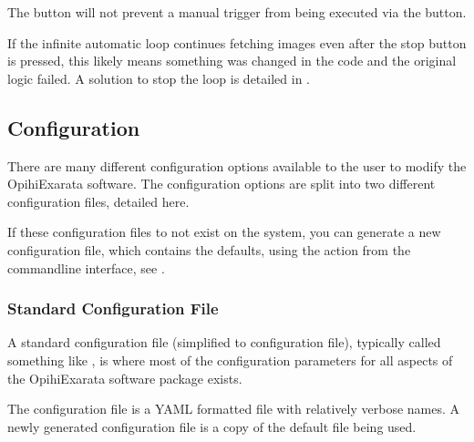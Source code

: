 \documentclass[letterpaper,11pt,english]{sphinxmanual}
\begin{document}
\sphinxAtStartPar
The  button will not prevent a manual trigger from being
executed via the  button.

\sphinxAtStartPar
If the infinite automatic loop continues fetching images even after the stop
button is pressed, this likely means something was changed in the code and
the original logic failed. A solution to stop the loop is detailed in
{\hyperref[\detokenize{user/troubleshooting:user-troubleshooting-automatic-mode-stop-button-not-working}]{}}.

\sphinxstepscope


\subsection{Configuration}
\label{\detokenize{user/configuration:configuration}}\label{\detokenize{user/configuration:user-configuration}}\label{\detokenize{user/configuration::doc}}
\sphinxAtStartPar
There are many different configuration options available to the user to
modify the OpihiExarata software. The configuration options are split into
two different configuration files, detailed here.

\sphinxAtStartPar
If these configuration files to not exist on the system, you can generate a
new configuration file, which contains the defaults, using the
{\hyperref[\detokenize{user/command_line:cmdoption-arg-generate}]{}} action from the command\sphinxhyphen{}line interface, see {\hyperref[\detokenize{user/command_line:user-command-line-available-actions-generate}]{}}.


\subsubsection{Standard Configuration File}
\label{\detokenize{user/configuration:standard-configuration-file}}\label{\detokenize{user/configuration:user-configuration-standard-configuration-file}}
\sphinxAtStartPar
A standard configuration file (simplified to configuration file), typically
called something like , is where most of the
configuration parameters for all aspects of the OpihiExarata software package
exists.

\sphinxAtStartPar
The configuration file is a YAML formatted file with relatively verbose names.
A newly generated configuration file is a copy of the default file being used.
\end{document}
